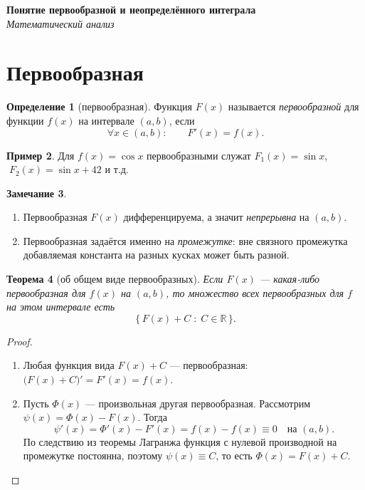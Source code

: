 \documentclass[11pt,a4paper]{article}
\newcommand{\coursename}{Математический анализ}
\newcommand{\doctitle}{Понятие первообразной и неопределённого интеграла}
\theoremstyle{definition}
\newtheorem{definition}{Определение}[section]
\newtheorem{example}[definition]{Пример}
\newtheorem{remark}[definition]{Замечание}
\theoremstyle{plain}
\newtheorem{theorem}[definition]{Теорема}
\newcommand{\R}{\mathbb{R}}
\begin{document}
\begin{center}
  {\LARGE\bfseries \doctitle}\\[4pt]
  {\large\itshape \coursename}
\end{center}
\vspace{6pt}

\section{Первообразная}

\begin{definition}[первообразная]
Функция $F(x)$ называется \emph{первообразной} для функции $f(x)$ на интервале $(a,b)$, если
\[
  \forall x\in(a,b):\qquad F'(x)=f(x).
\]
\end{definition}

\begin{example}
Для $f(x)=\cos x$ первообразными служат $F_1(x)=\sin x$, $\;F_2(x)=\sin x+42$ и т.д.
\end{example}

\begin{remark}\leavevmode
\begin{enumerate}[label=\arabic*),leftmargin=*]
  \item Первообразная $F(x)$ дифференцируема, а значит \emph{непрерывна} на $(a,b)$.
  \item Первообразная задаётся именно на \emph{промежутке}: вне связного промежутка добавляемая
        константа на разных кусках может быть разной.
\end{enumerate}
\end{remark}

\begin{theorem}[об общем виде первообразных]
Если $F(x)$ --- какая-либо первообразная для $f(x)$ на $(a,b)$, то множество всех первообразных
для $f$ на этом интервале есть
\[
  \bigl\{\,F(x)+C \;:\; C\in\R\,\bigr\}.
\]
\end{theorem}

\begin{proof}\leavevmode
\begin{enumerate}[label=\arabic*),leftmargin=*]
  \item Любая функция вида $F(x)+C$ — первообразная: $\bigl(F(x)+C\bigr)'=F'(x)=f(x)$.
  \item Пусть $\Phi(x)$ — произвольная другая первообразная. Рассмотрим
        $\psi(x)=\Phi(x)-F(x)$. Тогда
        \[
          \psi'(x)=\Phi'(x)-F'(x)=f(x)-f(x)\equiv 0 \quad\text{на }(a,b).
        \]
        По следствию из теоремы Лагранжа функция с нулевой производной на промежутке постоянна,
        поэтому $\psi(x)\equiv C$, то есть $\Phi(x)=F(x)+C$. \qedhere
\end{enumerate}
\end{proof}
\end{document}
